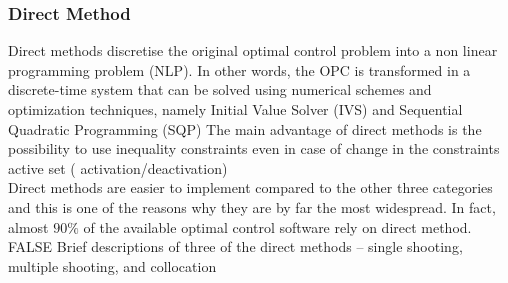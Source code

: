 \subsubsection{Direct Method}
%
Direct methods discretise the original optimal control problem into a  non linear programming problem (NLP). In other words, the OPC is transformed in a discrete-time system that can be solved using numerical schemes and  optimization techniques, namely Initial Value Solver (IVS) and Sequential Quadratic Programming (SQP) \cite{bertolazzi2005symbolic}
The main advantage of direct methods is the possibility to use inequality constraints even in case of change in the constraints active set ( activation/deactivation)\cite{biral2016notes}\\
Direct methods are easier to implement compared to the other three categories and this is one of the reasons why they are by far the most widespread. In fact, almost $90\%$ of the available optimal control software rely on direct method. \cite{rao2009survey,rodrigues2014optimal}
%
\if FALSE
Brief descriptions
of three of the direct methods – single shooting, multiple shooting, and collocation
\fi
%
%
